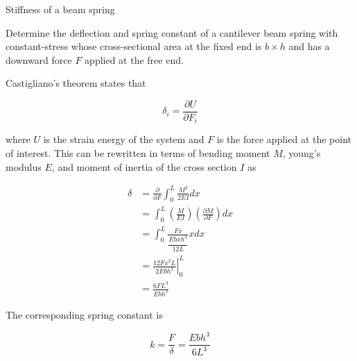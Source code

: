\documentclass[
10pt,
a4paper,
openany,
svgnames,
]{book}
\begin{document}
\begin{example} Stiffness of a beam spring

  Determine the deflection and spring constant of a cantilever beam spring with constant-stress whose cross-sectional area at the fixed end is $b \times h$ and has a downward force $F$ applied at the free end.

  \begin{figure}[H]
    \centering
  \end{figure}
  
\end{example}
\begin{solution}
  Castigliano’s theorem states that

  \[\delta_i = \frac{\partial U}{\partial F_i}\]

  where $U$ is the strain energy of the system and $F$ is the force applied at the point of interest. This can be rewritten in terms of bending moment $M$, young’s modulus $E$, and moment of inertia of the cross section $I$ as

  \begin{align*}
    \delta  &= \frac{\partial }{\partial F} \int_0^L \frac{M^2}{2EI}dx \\ 
            &= \int_0^L \left( \frac{M}{EI} \right)\left( \frac{\partial M}{\partial F} \right)dx \\ 
            &= \int_0^L \frac{Fx}{\dfrac{Ebxh^3}{12L}}xdx \\ 
            &= \left. \frac{12Fx^2L}{2Ebh^3} \right|_0^L \\ 
            &= \frac{6FL^3}{Ebh^3}
  \end{align*}

    The corresponding spring constant is

    \[k = \frac{F}{\delta } = \frac{Ebh^3}{6L^3}\]
\end{solution}
\end{document}
